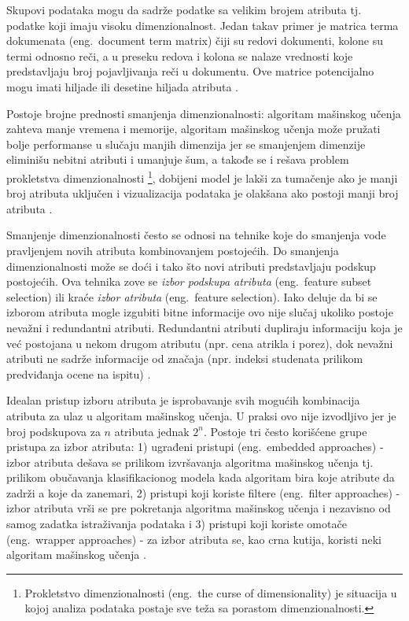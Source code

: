 \documentclass[12pt,oneside]{memoir}
\begin{document}
Skupovi podataka mogu da sadrže podatke sa velikim brojem atributa tj. podatke koji imaju visoku dimenzionalnost. Jedan takav primer je matrica terma dokumenata (eng.~document term matrix) čiji su redovi dokumenti, kolone su termi odnosno reči, a u preseku redova i kolona se nalaze vrednosti koje predstavljaju broj pojavljivanja reči u dokumentu. Ove matrice potencijalno mogu imati hiljade ili desetine hiljada atributa \cite{mitic}. 

Postoje brojne prednosti smanjenja dimenzionalnosti: algoritam mašinskog učenja zahteva manje vremena i memorije, algoritam mašinskog učenja može pružati bolje performanse u slučaju manjih dimenzija jer se smanjenjem dimenzije eliminišu nebitni atributi i umanjuje šum, a takođe se i rešava problem prokletstva dimenzionalnosti \footnote{Prokletstvo dimenzionalnosti (eng.~the curse of dimensionality) je situacija u kojoj analiza podataka postaje sve teža sa porastom dimenzionalnosti.}, dobijeni model je lakši za tumačenje ako je manji broj atributa uključen i vizualizacija podataka je olakšana ako postoji manji broj atributa \cite{mitic, UMLFTA}.

Smanjenje dimenzionalnosti često se odnosi na tehnike koje do smanjenja vode pravljenjem novih atributa kombinovanjem postojećih. Do smanjenja dimenzionalnosti može se doći i tako što novi atributi predstavljaju podskup postojećih. Ova tehnika zove se \textit{izbor podskupa atributa} (eng.~feature subset selection) ili kraće \textit{izbor atributa} (eng.~feature selection). Iako deluje da bi se izborom atributa mogle izgubiti bitne informacije ovo nije slučaj ukoliko postoje nevažni i redundantni atributi. Redundantni atributi dupliraju informaciju koja je već postojana u nekom drugom atributu (npr. cena atrikla i porez), dok nevažni atributi ne sadrže informacije od značaja (npr. indeksi studenata prilikom predviđanja ocene na ispitu) \cite{mitic}. 

Idealan pristup izboru atributa je isprobavanje svih mogućih kombinacija atributa za ulaz u algoritam mašinskog učenja. U praksi ovo nije izvodljivo jer je broj podskupova za $n$ atributa jednak $2^n$. Postoje tri često korišćene grupe pristupa za izbor atributa: 1) ugrađeni pristupi (eng.~embedded approaches) - izbor atributa dešava se prilikom izvršavanja algoritma mašinskog učenja tj. prilikom obučavanja klasifikacionog modela kada algoritam bira koje atribute da zadrži a koje da zanemari, 2) pristupi koji koriste filtere (eng.~filter approaches) - izbor atributa vrši se pre pokretanja algoritma mašinskog učenja i nezavisno od samog zadatka istraživanja podataka i 3) pristupi koji koriste omotače (eng.~wrapper approaches) - za izbor atributa se, kao crna kutija, koristi neki algoritam mašinskog učenja \cite{mitic, UMLFTA, aggarwal}.
\end{document}
